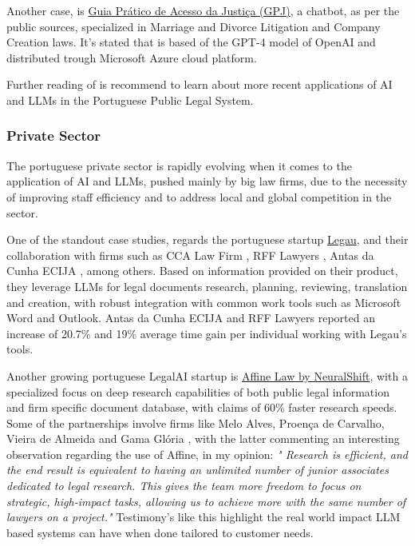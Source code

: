 \documentclass[11pt,a4paper,twoside,openright]{book}
\begin{document}
\par Another case, is \href{https://justica.gov.pt/Servicos/Guia-pratico-da-Justica}{Guia Prático de Acesso da Justiça (GPJ)}, a chatbot, as per the public sources, specialized in Marriage and Divorce Litigation and Company Creation laws. It's stated that is based of the GPT-4 model of OpenAI and distributed trough Microsoft Azure cloud platform.

\par Further reading of \textcite{IA_Portugal_2024} is recommend to learn about more recent applications of AI and LLMs in the Portuguese Public Legal System.

\subsubsection{Private Sector}
The portuguese private sector is rapidly evolving when it comes to the application of AI and LLMs, pushed mainly by big law firms, due to the necessity of improving staff efficiency and to address local and global competition in the sector.

\par One of the standout case studies, regards the portuguese startup \href{https://legau.com/}{Legau}, and their collaboration with firms such as CCA Law Firm \parencite{legau_cca_2025}, RFF Lawyers \parencite{legau_rff_2025}, Antas da Cunha ECIJA \parencite{legau_adcecija_2025}, among others. Based on information provided on their product, they leverage LLMs for legal documents research, planning, reviewing, translation and creation, with robust integration with common work tools such as Microsoft Word and Outlook. Antas da Cunha ECIJA and RFF Lawyers reported an increase of 20.7\% and 19\% average time gain per individual working with Legau's tools. 

\par Another growing portuguese LegalAI startup is  \href{https://www.affine.law/pt}{Affine Law by NeuralShift}, with a specialized focus on deep research capabilities of both public legal information and firm specific document database, with claims of 60\% faster research speeds. Some of the partnerships involve firms like Melo Alves, Proença de Carvalho, Vieira de Almeida and Gama Glória \parencite{affine_2025}, with the latter commenting an interesting observation regarding the use of Affine, in my opinion: \textit{" Research is efficient, and the end result is equivalent to having an unlimited number of junior associates dedicated to legal research. This gives the team more freedom to focus on strategic, high-impact tasks, allowing us to achieve more with the same number of lawyers on a project." }
Testimony's like this highlight the real world impact LLM based systems can have when done tailored to customer needs.
\end{document}
